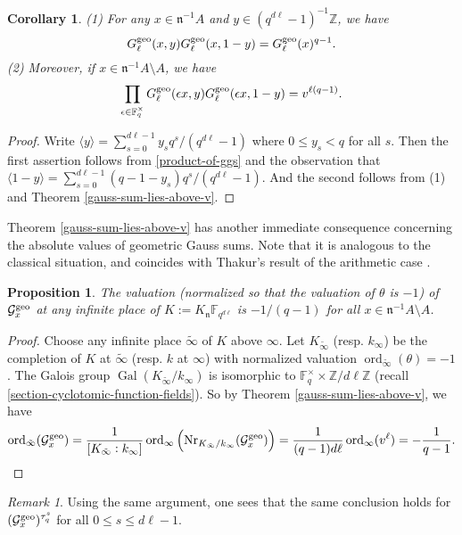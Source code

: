\documentclass[11pt]{amsart}
\theoremstyle{plain}
\newtheorem{prop}[thm]{Proposition}
\newtheorem{cor}[thm]{Corollary}
\theoremstyle{definition}
\theoremstyle{remark}
\newtheorem{rem}[thm]{Remark}
\numberwithin{equation}{section}
\newcommand{\ZZ}{\mathbb{Z}}
\newcommand{\FF}{\mathbb{F}}
\newcommand{\nfk}{\mathfrak{n}}
\newcommand{\Gcal}{\mathcal{G}}
\newcommand{\Gal}{\operatorname{Gal}}
\newcommand{\Nr}{\operatorname{Nr}}
\newcommand{\ord}{\operatorname{ord}}
\newcommand{\td}{\tilde}
\newcommand{\ang}[1]{\langle #1 \rangle}
\newcommand{\Fqst}{\FF_q^\times}
\newcommand{\Fqdl}{\FF_{q^{d\l}}}
\newcommand{\T}{\theta}
\newcommand{\bggs}{\Gcal^{\textnormal{geo}}}
\newcommand{\ggs}{G_\l^{\textnormal{geo}}}
\let\l\ell
\begin{document}
	\begin{cor}
		(1) For any $x \in \nfk^{-1}A$ and $y \in (q^{d\l}-1)^{-1}\ZZ$, we have
		$$
		\ggs(x,y) \ggs(x,1-y) = \ggs(x)^{q-1}.
		$$
		(2) Moreover, if $x \in \nfk^{-1}A \setminus A$, we have
		$$
		\prod_{\epsilon \in \Fqst}
		\ggs(\epsilon x,y) \ggs(\epsilon x,1-y) = v^{\l(q-1)}.
		$$
	\end{cor}
	
	\begin{proof}
		Write $\ang{y} = \sum_{s=0}^{d\l-1} y_sq^s/(q^{d\l}-1)$ where $0\leq y_s < q$ for all $s$.
		Then the first assertion follows from \eqref{product-of-ggs} and the observation that $\ang{1-y} = \sum_{s=0}^{d\l-1} (q-1-y_s)q^s/(q^{d\l}-1)$.
		And the second follows from (1) and Theorem \ref{gauss-sum-lies-above-v}.
	\end{proof}
	
	Theorem \ref{gauss-sum-lies-above-v} has another immediate consequence concerning the absolute values of geometric Gauss sums.
	Note that it is analogous to the classical situation, and coincides with Thakur's result of the arithmetic case \cite[Theorem IV]{thakur1988gauss}.
	
	\begin{prop}    \label{absolute-values}
		The valuation (normalized so that the valuation of $\T$ is $-1$) of $\bggs_x$ at any infinite place of $K := K_{\nfk}\Fqdl$ is $-1/(q-1)$ for all $x \in \nfk^{-1}A \setminus A$.
	\end{prop}
	
	\begin{proof}
		Choose any infinite place $\td{\infty}$ of $K$ above $\infty$.
		Let $K_{\td{\infty}}$ (resp. $k_\infty$) be the completion of $K$ at $\td{\infty}$ (resp. $k$ at $\infty$) with normalized valuation $\ord_{\td{\infty}} (\T) = -1$.
		The Galois group $\Gal(K_{\td{\infty}}/k_\infty)$ is isomorphic to $\Fqst \times \ZZ/d\l \ZZ$ (recall \ref{section-cyclotomic-function-fields}).
		So by Theorem \ref{gauss-sum-lies-above-v}, we have
		$$
		\ord_{\td{\infty}} (\bggs_x)
		= \frac{1}{[K_{\td{\infty}} : k_\infty]} \ord_{\infty} \left( \Nr_{K_{\td{\infty}}/k_\infty} (\bggs_x) \right)
		=  \frac{1}{(q-1)d\l} \ord_{\infty}(v^\l)
		= -\frac{1}{q-1}.
		$$
	\end{proof}
	
	\begin{rem}   \label{remark-of-absolute-values}
		Using the same argument, one sees that the same conclusion holds for $(\bggs_x)^{\tau_q^s}$ for all $0 \leq s \leq d\l-1$.
	\end{rem}
	
\end{document}
